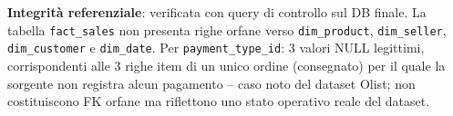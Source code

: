 \documentclass[12pt,a4paper]{article}
\begin{document}
\textbf{Integrità referenziale}: verificata con query di controllo sul DB finale.
La tabella \texttt{fact\_sales} non presenta righe orfane verso
\texttt{dim\_product}, \texttt{dim\_seller}, \texttt{dim\_customer} e
\texttt{dim\_date}. Per \texttt{payment\_type\_id}: 3 valori NULL legittimi,
corrispondenti alle 3 righe item di un unico ordine (consegnato) per il quale la
sorgente non registra alcun pagamento -- caso noto del dataset Olist; non
costituiscono FK orfane ma riflettono uno stato operativo reale del dataset.
\end{document}
